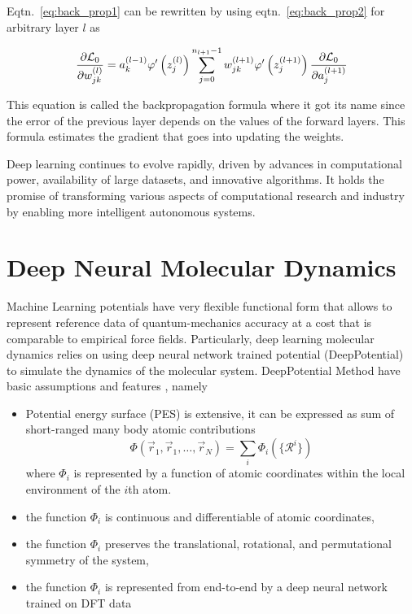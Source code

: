 Eqtn.~\eqref{eq:back_prop1} can be rewritten by using
eqtn.~\eqref{eq:back_prop2} for arbitrary layer $l$ as

\begin{equation}
    \pdv{\mathcal{L}_0}{w^{(l)}_{jk}} =  a^{(l-1)}_k \varphi'\left( z^{(l)}_j
    \right) \sum_{j=0}^{n_{l+1}-1}
    w^{(l+1)}_{jk} \varphi'
    \left( z^{(l+1)}_j \right)	 \pdv{\mathcal{L}_0}{a^{(l+1)}_j}
\end{equation}

This equation is  called the backpropagation formula where it got its name
since the error
of the
previous layer depends on the values of the forward layers. This formula
estimates the gradient that goes into updating the weights.

Deep learning continues to evolve rapidly, driven by advances in
computational power, availability of large datasets, and innovative algorithms.
It holds the promise of transforming various aspects of computational research
and industry
by enabling more intelligent autonomous systems.

\section{Deep Neural Molecular Dynamics}
Machine Learning potentials have very flexible functional form that allows to
represent reference data of quantum-mechanics accuracy at a cost that is
comparable to empirical force fields. Particularly, deep learning molecular
dynamics relies on using deep neural network trained potential (DeepPotential)
to simulate the
dynamics of the molecular system.  DeepPotential Method have basic assumptions
and features
\cite{zhang2018deep,zhang2018end},
namely

\begin{itemize}

    \item  Potential energy surface (PES) is extensive, it can be expressed as
          sum		of	     short-ranged many body atomic
          contributions
          \begin{equation}
              \Phi(\vec{r}_1,\vec{r}_1,\hdots, \vec{r}_N) = \sum_i
              \Phi_i(\{\mathcal{R}^i\})
          \end{equation}
          where $\Phi_i$ is represented by	     a		 function
          of atomic coordinates within the local environment of      the
          $i$th atom.
    \item  the function $\Phi_i$ is continuous and differentiable
          of atomic coordinates,
    \item the function $\Phi_i$ preserves the translational, rotational,
          and
          permutational symmetry of the system,
    \item the function $\Phi_i$ is represented from end-to-end by a deep
          neural network trained on DFT data
\end{itemize}

